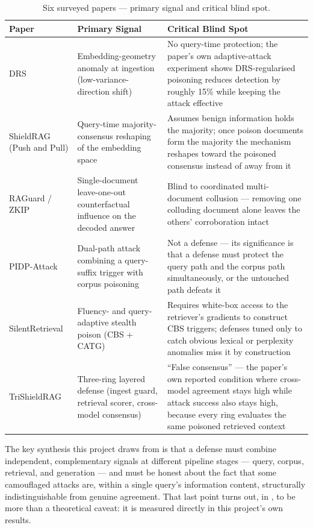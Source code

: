 \begin{table}[htbp]
\centering
\small
\begin{tabularx}{\textwidth}{@{}l Y Y@{}}
\toprule
\textbf{Paper} & \textbf{Primary Signal} & \textbf{Critical Blind Spot} \\
\midrule
DRS & Embedding-geometry anomaly at ingestion (low-variance-direction shift) & No query-time protection; the paper's own adaptive-attack experiment shows DRS-regularised poisoning reduces detection by roughly 15\% while keeping the attack effective \\
ShieldRAG (Push and Pull) & Query-time majority-consensus reshaping of the embedding space & Assumes benign information holds the majority; once poison documents form the majority the mechanism reshapes toward the poisoned consensus instead of away from it \\
RAGuard / ZKIP & Single-document leave-one-out counterfactual influence on the decoded answer & Blind to coordinated multi-document collusion --- removing one colluding document alone leaves the others' corroboration intact \\
PIDP-Attack & Dual-path attack combining a query-suffix trigger with corpus poisoning & Not a defense --- its significance is that a defense must protect the query path and the corpus path simultaneously, or the untouched path defeats it \\
SilentRetrieval & Fluency- and query-adaptive stealth poison (CBS + CATG) & Requires white-box access to the retriever's gradients to construct CBS triggers; defenses tuned only to catch obvious lexical or perplexity anomalies miss it by construction \\
TriShieldRAG & Three-ring layered defense (ingest guard, retrieval scorer, cross-model consensus) & ``False consensus'' --- the paper's own reported condition where cross-model agreement stays high while attack success also stays high, because every ring evaluates the same poisoned retrieved context \\
\bottomrule
\end{tabularx}
\caption{Six surveyed papers --- primary signal and critical blind spot.}
\label{tab:literature}
\end{table}

The key synthesis this project draws from  is that a
defense must combine independent, complementary signals at different
pipeline stages --- query, corpus, retrieval, and generation --- and must
be honest about the fact that some camouflaged attacks are, within a
single query's information content, structurally indistinguishable from
genuine agreement. That last point turns out, in , to
be more than a theoretical caveat: it is measured directly in this
project's own results.

